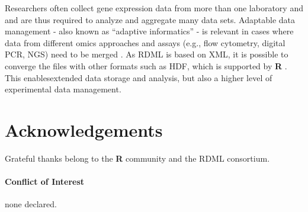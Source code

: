 \documentclass{bioinfo}
\begin{document}
Researchers often collect gene expression data from more than one laboratory and  and are thus required to analyze and aggregate  many data sets. Adaptable data management -  also known as “adaptive 
informatics” - is relevant in cases where data from different omics approaches and  assays (e.g., flow cytometry, digital PCR, NGS) need to be merged 
\cite{baker_quantitative_2012}.  As RDML is based on XML, it is 
possible to converge the files with other formats such as HDF,
\cite{millard_adaptive_2011} which is supported by \textbf{R} \cite{Fischer_HDF5}. This enablesextended data storage 
and analysis, but also a higher level of  experimental data management.

\section{Acknowledgements}
Grateful thanks belong to the \textbf{R} community and the RDML consortium.
\paragraph{Conflict of Interest\textcolon} none declared.

%
%
%
%
%
%

%

\end{document}
